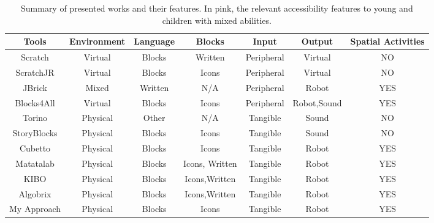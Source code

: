 \documentclass[oneside,%
                    author={Malak Hajji},
                    degree={BSc},
                    title={Designing An Accessible Ozobot Programming Platform for Students},
                  subtitle={With Mixed Visual Abilities}]{dissertation}
\begin{document}
\FloatBarrier
\begin{table}[h]
\centering
\begin{tabular}{|c|c|c|c|c|c|c|}
\hline
Tools       & Environment   &Language             &Blocks     &Input      &Output     &Spatial Activities     \\ \hline
Scratch       &Virtual           & \textcolor{mypink}{Blocks}    &Written          &Peripheral         &Virtual          &NO \\ \hline
ScratchJR    &Virtual            & \textcolor{mypink}{Blocks}    &Icons         &Peripheral         &Virtual          &NO \\ \hline
JBrick &Mixed            &Written    &N/A         &Peripheral        &\textcolor{mypink}{Robot}         &\textcolor{mypink}{YES} \\ \hline
Blocks4All &Virtual            & \textcolor{mypink}{Blocks}    &\textcolor{mypink}{Icons}         &Peripheral         &\textcolor{mypink}{Robot},Sound          &\textcolor{mypink}{YES} \\ \hline
Torino &Physical            &Other    &N/A          &Tangible          &Sound          &NO \\ \hline
StoryBlocks &\textcolor{mypink}{Physical}           & \textcolor{mypink}{Blocks}    &\textcolor{mypink}{Icons}        &\textcolor{mypink}{Tangible}          &Sound          &NO \\ \hline
Cubetto &\textcolor{mypink}{Physical}           & \textcolor{mypink}{Blocks}    &\textcolor{mypink}{Icons}        &\textcolor{mypink}{Tangible}          &\textcolor{mypink}{Robot}         &\textcolor{mypink}{YES}\\ \hline
Matatalab   &\textcolor{mypink}{Physical}           & \textcolor{mypink}{Blocks}    &\textcolor{mypink}{Icons}, Written     &\textcolor{mypink}{Tangible}          &\textcolor{mypink}{Robot}         &\textcolor{mypink}{YES} \\ \hline
KIBO &\textcolor{mypink}{Physical}           & \textcolor{mypink}{Blocks}    &\textcolor{mypink}{Icons},Written      &\textcolor{mypink}{Tangible}          &\textcolor{mypink}{Robot}         &\textcolor{mypink}{YES}\\ \hline
Algobrix   &\textcolor{mypink}{Physical}           & \textcolor{mypink}{Blocks}    &\textcolor{mypink}{Icons},Written      &\textcolor{mypink}{Tangible}          &\textcolor{mypink}{Robot}         &\textcolor{mypink}{YES}\\ \hline
My Approach &\textcolor{mypink}{Physical}           & \textcolor{mypink}{Blocks}    &\textcolor{mypink}{Icons}    &\textcolor{mypink}{Tangible}          &\textcolor{mypink}{Robot}         &\textcolor{mypink}{YES}\\ \hline
\hline
\end{tabular}
\caption{Summary of presented works and their features. In pink, the relevant accessibility features to young and children with mixed abilities.}
\label{tab-final}
\end{table}
\FloatBarrier
\end{document}
